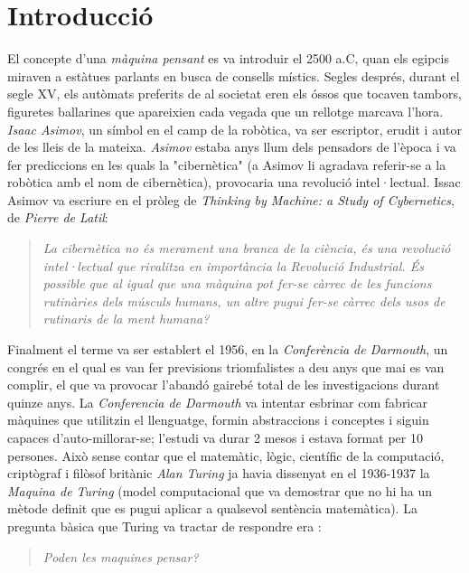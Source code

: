 \section{Introducció}

El concepte d'una \emph{màquina pensant} es va introduir el 2500 a.C, quan els egipcis miraven a estàtues parlants en busca de consells místics. Segles després, durant el segle XV, els autòmats preferits de al societat eren els óssos que tocaven tambors, figuretes ballarines que apareixien cada vegada que un rellotge marcava l'hora. \emph{Isaac Asimov}, un símbol en el camp de la robòtica, va ser escriptor, erudit i autor de les lleis de la mateixa. \emph{Asimov} estaba anys llum dels pensadors de l'època i va fer prediccions en les quals la "cibernètica" (a Asimov li agradava referir-se a la robòtica amb el nom de cibernètica), provocaria una revolució intel·lectual. 
Issac Asimov va escriure en el pròleg de \emph{Thinking by Machine: a Study of Cybernetics}, de \emph{Pierre de Latil}:

\begin{quote}
\emph{La cibernètica no és merament una branca de la ciència, és una revolució intel·lectual que rivalitza en importància la Revolució Industrial. És possible que al igual que una màquina pot fer-se càrrec de les funcions rutinàries dels músculs humans, un altre pugui fer-se càrrec dels usos de rutinaris de la ment humana?}

\end{quote}

Finalment el terme va ser establert el 1956, en la \emph{Conferència de Darmouth}, un congrés en el qual es van fer previsions triomfalistes a deu anys que mai es van complir, el que va provocar l'abandó gairebé total de les investigacions durant quinze anys. La \emph{Conferencia de Darmouth} va intentar esbrinar com fabricar màquines que utilitzin el llenguatge, formin abstraccions i conceptes i siguin capaces d'auto-millorar-se; l'estudi va durar 2 mesos i estava format per 10 persones. Això sense contar que el matemàtic, lògic, científic de la computació, criptògraf  i filòsof britànic \emph{Alan Turing} ja havia dissenyat en el 1936-1937 la \emph{Maquina de Turing} (model computacional que va demostrar que no hi ha un mètode definit que es pugui aplicar a qualsevol sentència matemàtica). La pregunta bàsica que Turing va tractar de respondre era \cite{Matur} \cite{Algor}: 

\begin{quote}
	\emph{Poden les maquines pensar?}
\end{quote}

